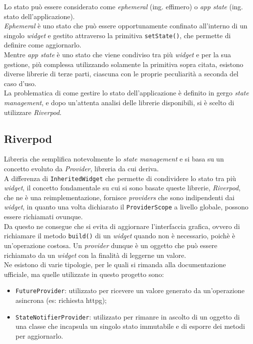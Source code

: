 Lo stato può essere considerato come \emph{ephemeral} (ing. effimero) o \emph{app state} (ing. stato dell'applicazione). \\
\emph{Ephemeral} è uno stato che può essere opportunamente confinato all'interno di un singolo \emph{widget} e gestito attraverso la primitiva \lstinline{setState()}, che permette di definire come aggiornarlo.\\
Mentre \emph{app state} è uno stato che viene condiviso tra più \emph{widget} e per la sua gestione, più complessa utilizzando solamente la primitiva sopra citata, esistono diverse librerie di terze parti, ciascuna con le proprie peculiarità a seconda del caso d'uso.\\
\indent La problematica di come gestire lo stato dell'applicazione è definito in gergo \emph{state management}\cite{site:flutter-state-mgmt}, e dopo un'attenta analisi delle librerie disponibili, si è scelto di utilizzare \emph{Riverpod}\cite{site:riverpod}.\\

\subsection{Riverpod}
\label{subsec:riverpod}
Libreria che semplifica notevolmente lo \emph{state management} e si basa su un concetto evoluto da \emph{Provider}\cite{site:provider}, libreria da cui deriva.\\
A differenza di \lstinline{InheritedWidget}\cite{site:inheritw} che permette di condividere lo stato tra più \emph{widget}, il concetto fondamentale su cui si sono basate queste librerie, \emph{Riverpod}, che ne è una reimplementazione, fornisce \emph{providers} che sono indipendenti dai \emph{widget}, in quanto una volta dichiarato il \lstinline{ProviderScope} a livello globale, possono essere richiamati ovunque.\\
Da questo ne consegue che si evita di aggiornare l'interfaccia grafica, ovvero di richiamare il metodo \lstinline{build()} di un \emph{widget} quando non è necessario, poichè è un'operazione costosa.
Un \emph{provider} dunque è un oggetto che può essere richiamato da un \emph{widget} con la finalità di leggerne un valore.\\
Ne esistono di varie tipologie, per le quali si rimanda alla documentazione ufficiale\cite{site:riverpod}, ma quelle utilizzate in questo progetto sono:
\begin{itemize}
    \item \lstinline{FutureProvider}: utilizzato per ricevere un valore generato da un'operazione asincrona (es: richiesta \gls{httpg})\glsoccur;
    \item \lstinline{StateNotifierProvider}: utilizzato per rimanre in ascolto di un oggetto di una classe che incapsula un singolo stato immutabile e di esporre dei metodi per aggiornarlo.
\end{itemize}

